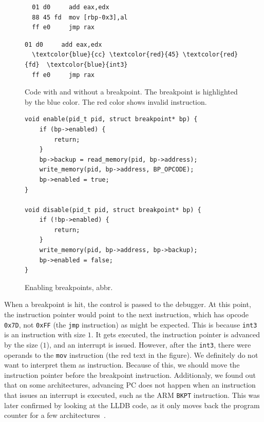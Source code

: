 \begin{figure}
    \begin{minipage}{0.45\textwidth}
        \begin{Verbatim}
  01 d0     add eax,edx
  88 45 fd  mov [rbp-0x3],al
  ff e0     jmp rax
        \end{Verbatim}
    \end{minipage}
    \hfill\vline\hfill
    \begin{minipage}{0.45\textwidth}
        \begin{Verbatim}[commandchars=\\\{\}]
  01 d0     add eax,edx
  \textcolor{blue}{cc} \textcolor{red}{45} \textcolor{red}{fd}  \textcolor{blue}{int3}
  ff e0     jmp rax
        \end{Verbatim}
    \end{minipage}
    \caption{Code with and without a breakpoint. The breakpoint is highlighted
    by the blue color. The red color shows invalid instruction.} 
    \label{fig:with-and-without-bp}
\end{figure}

\begin{figure}
    \begin{verbatim}
void enable(pid_t pid, struct breakpoint* bp) {
    if (bp->enabled) {
        return;
    }
    bp->backup = read_memory(pid, bp->address);
    write_memory(pid, bp->address, BP_OPCODE);
    bp->enabled = true;
}

void disable(pid_t pid, struct breakpoint* bp) {
    if (!bp->enabled) {
        return;
    }
    write_memory(pid, bp->address, bp->backup);
    bp->enabled = false;
}
    \end{verbatim}
    \caption{Enabling breakpoints, abbr.}
    \label{fig:breakpoint-enable}
\end{figure}

When a breakpoint is hit, the control is passed to the debugger. At this point,
the instruction pointer would point to the next instruction, which has opcode
\texttt{0x7D}, not \texttt{0xFF} (the \texttt{jmp} instruction) as might be
expected. This is because \texttt{int3} is an instruction with size $1$. It
gets executed, the instruction pointer is advanced by the size ($1$), and an
interrupt is issued. However, after the \texttt{int3}, there were operands to
the \texttt{mov} instruction (the red text in the figure). We definitely do not
want to interpret them as instruction. Because of this, we should move the
instruction pointer before the breakpoint instruction. Additionaly, we found
out that on some architectures, advancing PC does not happen when an
instruction that issues an interrupt is executed, such as the ARM \texttt{BKPT}
instruction. This was later confirmed by looking at the LLDB code, as it only
moves back the program counter for a few architectures~\cite{lldb-ip}.

